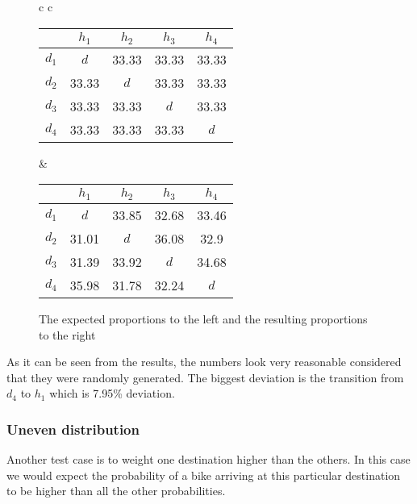 \begin{figure}
	
	\begin{tabular} {c c }
		
		\begin{tabular}{ | c | c c c c |}
			\hline
			& $ h_1 $ & $ h_2 $ & $ h_3 $ & $ h_4 $\\
			\hline
			$ d_1 $ & $ d $ & 33.33 & 33.33 & 33.33\\
			$ d_2 $ & 33.33 & $ d $ & 33.33 & 33.33\\
			$ d_3 $ & 33.33 & 33.33 & $ d $ & 33.33\\
			$ d_4 $ & 33.33 & 33.33 & 33.33 & $ d $\\
			\hline
		\end{tabular}
		
		&
		
		\begin{tabular}{ | c | c c c c |}
			\hline
			& $ h_1 $ & $ h_2 $ & $ h_3 $ & $ h_4 $\\
			\hline
			$ d_1 $ & $ d $ & 33.85 & 32.68 & 33.46\\
			$ d_2 $ & 31.01 & $ d $ & 36.08 & 32.9\\
			$ d_3 $ & 31.39 & 33.92 & $ d $ & 34.68 \\
			$ d_4 $ & 35.98 & 31.78 & 32.24 & $ d $\\
			\hline
		\end{tabular}
	\end{tabular}
	\caption{The expected proportions to the left and the resulting proportions to the right}\label{even_results}
\end{figure}

As it can be seen from the results, the numbers look very reasonable considered that they were randomly generated. 
The biggest deviation is the transition from $ d_4 $ to $ h_1 $ which is 7.95\% deviation. 

\subsubsection{Uneven distribution}
Another test case is to weight one destination higher than the others.
In this case we would expect the probability of a bike arriving at this particular destination to be higher than all the other probabilities.

